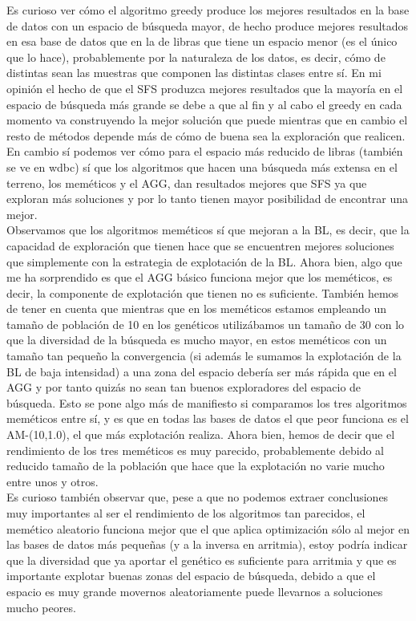 \documentclass[10pt,a4paper]{article}
\begin{document}
Es curioso ver cómo el algoritmo greedy produce los mejores resultados en la base de datos con un espacio de búsqueda mayor, de hecho produce mejores resultados en esa base de datos que en la de libras que tiene un espacio menor (es el único que lo hace), probablemente por la naturaleza de los datos, es decir, cómo de distintas sean las muestras que componen las distintas clases entre sí. En mi opinión el hecho de que el SFS produzca mejores resultados que la mayoría en el espacio de búsqueda más grande se debe a que al fin y al cabo el greedy en cada momento va construyendo la mejor solución que puede mientras que en cambio el resto de métodos depende más de cómo de buena sea la exploración que realicen.\\

En cambio sí podemos ver cómo para el espacio más reducido de libras (también se ve en wdbc) sí que los algoritmos que hacen una búsqueda más extensa en el terreno, los meméticos y el AGG, dan resultados mejores que SFS ya que exploran más soluciones y por lo tanto tienen mayor posibilidad de encontrar una mejor.\\

Observamos que los algoritmos meméticos sí que mejoran a la BL, es decir, que la capacidad de exploración que tienen hace que se encuentren mejores soluciones que simplemente con la estrategia de explotación de la BL. Ahora bien, algo que me ha sorprendido es que el AGG básico funciona mejor que los meméticos, es decir, la componente de explotación que tienen no es suficiente. También hemos de tener en cuenta que mientras que en los meméticos estamos empleando un tamaño de población de 10 en los genéticos utilizábamos un tamaño de 30 con lo que la diversidad de la búsqueda es mucho mayor, en estos meméticos con un tamaño tan pequeño la convergencia (si además le sumamos la explotación de la BL de baja intensidad) a una zona del espacio debería ser más rápida que en el AGG y por tanto quizás no sean tan buenos exploradores del espacio de búsqueda. Esto se pone algo más de manifiesto si comparamos los tres algoritmos meméticos entre sí, y es que en todas las bases de datos el que peor funciona es el AM-(10,1.0), el que más explotación realiza. Ahora bien, hemos de decir que el rendimiento de los tres meméticos es muy parecido, probablemente debido al reducido tamaño de la población que hace que la explotación no varie mucho entre unos y otros.\\

Es curioso también observar que, pese a que no podemos extraer conclusiones muy importantes al ser el rendimiento de los algoritmos tan parecidos, el memético aleatorio funciona mejor que el que aplica optimización sólo al mejor en las bases de datos más pequeñas (y a la inversa en arritmia), estoy podría indicar que la diversidad que ya aportar el genético es suficiente para arritmia y que es importante explotar buenas zonas del espacio de búsqueda, debido a que el espacio es muy grande movernos aleatoriamente puede llevarnos a soluciones mucho peores.\\
\end{document}
